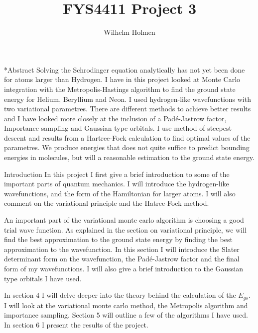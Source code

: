 \documentclass[a4paper, 12pt, titlepage]{article}
\author{Wilhelm Holmen}
\title{FYS4411 Project 3}
\begin{document}
 \maketitle
 \newpage

 \tableofcontents

 \newpage

\begin{subsection}*{Abstract}
 Solving the Schrodinger equation analytically has not yet been done for atoms larger than Hydrogen. I have in this project looked at Monte Carlo integration with the Metropolis-Hastings algorithm to find the ground state energy for Helium, Beryllium and Neon. I used hydrogen-like wavefunctions with two variational parametres. There are different methods to achieve better results and I have looked more closely at the inclusion of a Padé-Jastrow factor, Importance sampling and Gaussian type orbitals. I use method of steepest descent and results from a Hartree-Fock calculation to find optimal values of the parametres. We produce energies that does not quite suffice to predict bounding energies in molecules, but will a reasonable estimation to the ground state energy. 
\end{subsection}

\begin{section}{Introduction}
 In this project I first give a brief introduction to some of the important parts of quantum mechanics. I will introduce the hydrogen-like wavefunctions, and the form of the Hamiltonian for larger atoms. I will also comment on the variational principle and the Hatree-Fock method. \par
 An important part of the variational monte carlo algorithm is choosing a good trial wave function. As explained in the section on variational principle, we will find the best approximation to the ground state energy by finding the best approximation to the wavefunction. In this section I will introduce the Slater determinant form on the wavefunction, the Padé-Jastrow factor and the final form of my wavefunctions. I will also give a brief introduction to the Gaussian type orbitals I have used. \par
 In section 4 I will delve deeper into the theory behind the calculation of the $E_{gs}$. I will look at the variational monte carlo method, the Metropolis algorithm and importance sampling. Section 5 will outline a few of the algorithms I have used. In section 6 I present the results of the project. 
\end{section}
\end{document}
